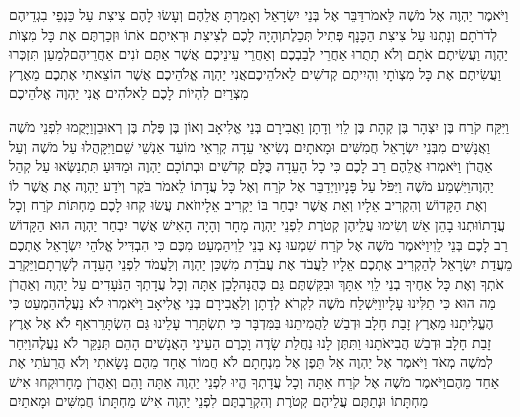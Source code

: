\documentclass[../main/main.tex]{subfiles}
\begin{document}
\begin{multicols*}{\ncols}
וַיֹּאמֶר יַהְוֶה אֶל מֹשֶׁה לֵּאמֹר\PreVerseSpace{}דַּבֵּר אֶל בְּנֵי יִשְׂרָאֵל וְאָמַרְתָּ אֲלֵהֶם וְעָשׂוּ לָהֶם צִיצִת עַל כַּנְפֵי בִגְדֵיהֶם לְדֹרֹתָם וְנָתְנוּ עַל צִיצִת הַכָּנָף פְּתִיל תְּכֵלֶת\PreVerseSpace{}וְהָיָה לָכֶם לְצִיצִת וּרְאִיתֶם אֹתוֹ וּזְכַרְתֶּם אֶת כָּל מִצְוֺת יַהְוֶה וַעֲשִׂיתֶם אֹתָם וְלֹא תָתֻרוּ אַחֲרֵי לְבַבְכֶם וְאַחֲרֵי עֵינֵיכֶם אֲשֶׁר אַתֶּם זֹנִים אַחֲרֵיהֶם\PreVerseSpace{}לְמַעַן תִּזְכְּרוּ וַעֲשִׂיתֶם אֶת כָּל מִצְוֺתָי וִהְיִיתֶם קְדֹשִׁים לֵאלֹהֵיכֶם\PreVerseSpace{}אֲנִי יַהְוֶה אֱלֹהֵיכֶם אֲשֶׁר הוֹצֵאתִי אֶתְכֶם מֵאֶרֶץ מִצְרַיִם לִהְיוֹת לָכֶם לֵאלֹהִים אֲנִי יַהְוֶה אֱלֹהֵיכֶם\OpenSection{}\par
{}וַיִּקַּח קֹרַח בֶּן יִצְהָר בֶּן קְהָת בֶּן לֵוִי וְדָתָן וַאֲבִירָם בְּנֵי אֱלִיאָב וְאוֹן בֶּן פֶּלֶת בֶּן\SubEnd{} רְאוּבֵן\PreVerseSpace{}וַיָּקֻמוּ לִפְנֵי מֹשֶׁה וַאֲנָשִׁים מִבְּנֵי יִשְׂרָאֵל חֲמִשִּׁים וּמָאתָיִם נְשִׂיאֵי עֵדָה קְרִאֵי מוֹעֵד אַנְשֵׁי שֵׁם\PreVerseSpace{}וַיִּקָּהֲלוּ עַל מֹשֶׁה וְעַל אַהֲרֹן וַיֹּאמְרוּ אֲלֵהֶם רַב לָכֶם כִּי כָל הָעֵדָה כֻּלָּם קְדֹשִׁים וּבְתוֹכָם יַהְוֶה וּמַדּוּעַ תִּתְנַשְּׂאוּ עַל קְהַל יַהְוֶה\PreVerseSpace{}וַיִּשְׁמַע מֹשֶׁה וַיִּפֹּל עַל פָּנָיו\PreVerseSpace{}וַיְדַבֵּר אֶל קֹרַח וְאֶל כָּל עֲדָתוֹ לֵאמֹר בֹּקֶר וְיֹדַע יַהְוֶה אֶת אֲשֶׁר לוֹ וְאֶת הַקָּדוֹשׁ וְהִקְרִיב אֵלָיו וְאֵת אֲשֶׁר יִבְחַר בּוֹ יַקְרִיב אֵלָיו\PreVerseSpace{}זֹאת עֲשׂוּ קְחוּ לָכֶם מַחְתּוֹת קֹרַח וְכָל עֲדָתוֹ\PreVerseSpace{}וּתְנוּ בָהֵן אֵשׁ וְשִׂימוּ עֲלֵיהֶן קְטֹרֶת לִפְנֵי יַהְוֶה מָחָר וְהָיָה הָאִישׁ אֲשֶׁר יִבְחַר יַהְוֶה הוּא הַקָּדוֹשׁ רַב לָכֶם בְּנֵי לֵוִי\PreVerseSpace{}וַיֹּאמֶר מֹשֶׁה אֶל קֹרַח שִׁמְעוּ נָא בְּנֵי לֵוִי\PreVerseSpace{}הַמְעַט מִכֶּם כִּי הִבְדִּיל אֱלֹהֵי יִשְׂרָאֵל אֶתְכֶם מֵעֲדַת יִשְׂרָאֵל לְהַקְרִיב אֶתְכֶם אֵלָיו לַעֲבֹד אֶת עֲבֹדַת מִשְׁכַּן יַהְוֶה וְלַעֲמֹד לִפְנֵי הָעֵדָה לְשָׁרְתָם\PreVerseSpace{}וַיַּקְרֵב אֹתְךָ וְאֶת כָּל אַחֶיךָ בְנֵי לֵוִי אִתָּךְ וּבִקַּשְׁתֶּם גַּם כְּהֻנָּה\PreVerseSpace{}לָכֵן אַתָּה וְכָל עֲדָתְךָ הַנֹּעָדִים עַל יַהְוֶה וְאַהֲרֹן מַה הוּא כִּי תַלִּינוּ\SubEnd{} עָלָיו\PreVerseSpace{}וַיִּשְׁלַח מֹשֶׁה לִקְרֹא לְדָתָן וְלַאֲבִירָם בְּנֵי אֱלִיאָב וַיֹּאמְרוּ לֹא נַעֲלֶה\PreVerseSpace{}הַמְעַט כִּי הֶעֱלִיתָנוּ מֵאֶרֶץ זָבַת חָלָב וּדְבַשׁ לַהֲמִיתֵנוּ בַּמִּדְבָּר כִּי תִשְׂתָּרֵר עָלֵינוּ גַּם הִשְׂתָּרֵר\PreVerseSpace{}אַף לֹא אֶל אֶרֶץ זָבַת חָלָב וּדְבַשׁ הֲבִיאֹתָנוּ וַתִּתֶּן לָנוּ נַחֲלַת שָׂדֶה וָכָרֶם הַעֵינֵי הָאֲנָשִׁים הָהֵם תְּנַקֵּר לֹא נַעֲלֶה\PreVerseSpace{}וַיִּחַר לְמֹשֶׁה מְאֹד וַיֹּאמֶר אֶל יַהְוֶה אַל תֵּפֶן אֶל מִנְחָתָם לֹא חֲמוֹר אֶחָד מֵהֶם נָשָׂאתִי וְלֹא הֲרֵעֹתִי אֶת אַחַד מֵהֶם\PreVerseSpace{}וַיֹּאמֶר מֹשֶׁה אֶל קֹרַח אַתָּה וְכָל עֲדָתְךָ הֱיוּ לִפְנֵי יַהְוֶה אַתָּה וָהֵם וְאַהֲרֹן מָחָר\PreVerseSpace{}וּקְחוּ אִישׁ מַחְתָּתוֹ וּנְתַתֶּם עֲלֵיהֶם קְטֹרֶת וְהִקְרַבְתֶּם לִפְנֵי יַהְוֶה אִישׁ מַחְתָּתוֹ חֲמִשִּׁים וּמָאתַיִם 
\end{multicols*}
\end{document}
